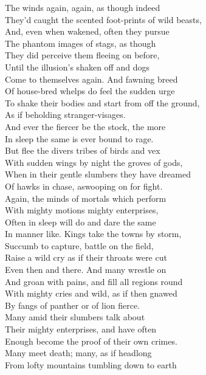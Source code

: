 The winds again, again, as though indeed\\
They'd caught the scented foot-prints of wild beasts,\\
And, even when wakened, often they pursue\\
The phantom images of stags, as though\\
They did perceive them fleeing on before,\\
Until the illusion's shaken off and dogs\\
Come to themselves again. And fawning breed\\
Of house-bred whelps do feel the sudden urge\\
To shake their bodies and start from off the ground,\\
As if beholding stranger-visages.\\
And ever the fiercer be the stock, the more\\
In sleep the same is ever bound to rage.\\
But flee the divers tribes of birds and vex\\
With sudden wings by night the groves of gods,\\
When in their gentle slumbers they have dreamed\\
Of hawks in chase, aswooping on for fight.\\
Again, the minds of mortals which perform\\
With mighty motions mighty enterprises,\\
Often in sleep will do and dare the same\\
In manner like. Kings take the towns by storm,\\
Succumb to capture, battle on the field,\\
Raise a wild cry as if their throats were cut\\
Even then and there. And many wrestle on\\
And groan with pains, and fill all regions round\\
With mighty cries and wild, as if then gnawed\\
By fangs of panther or of lion fierce.\\
Many amid their slumbers talk about\\
Their mighty enterprises, and have often\\
Enough become the proof of their own crimes.\\
Many meet death; many, as if headlong\\
From lofty mountains tumbling down to earth\\
